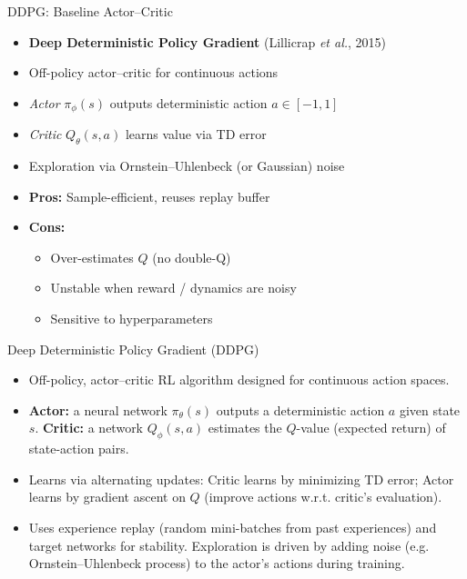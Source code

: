 \documentclass[11pt,aspectratio=169]{beamer}   %
\begin{document}
\begin{frame}{DDPG: Baseline Actor–Critic}
	\begin{itemize}
		\item \textbf{Deep Deterministic Policy Gradient} (Lillicrap \emph{et al.}, 2015)
		\item Off-policy actor–critic for continuous actions
		\item \emph{Actor} $\pi_\phi(s)$ outputs deterministic action $a\in[-1,1]$
		\item \emph{Critic} $Q_\theta(s,a)$ learns value via TD error
		\item Exploration via Ornstein–Uhlenbeck (or Gaussian) noise
		\item \textbf{Pros:} Sample-efficient, reuses replay buffer  
		\item \textbf{Cons:}  
		\begin{itemize}
			\item Over-estimates $Q$ (no double-Q)  
			\item Unstable when reward / dynamics are noisy  
			\item Sensitive to hyperparameters
		\end{itemize}
	\end{itemize}
\end{frame}

\begin{frame}{Deep Deterministic Policy Gradient (DDPG)}
	\begin{itemize}
		\item Off-policy, actor–critic RL algorithm designed for continuous action spaces.
		\item \textbf{Actor:} a neural network $\pi_\theta(s)$ outputs a deterministic action $a$ given state $s$. \textbf{Critic:} a network $Q_\phi(s,a)$ estimates the $Q$-value (expected return) of state-action pairs.
		\item Learns via alternating updates: Critic learns by minimizing TD error; Actor learns by gradient ascent on $Q$ (improve actions w.r.t. critic’s evaluation).
		\item Uses experience replay (random mini-batches from past experiences) and target networks for stability. Exploration is driven by adding noise (e.g. Ornstein–Uhlenbeck process) to the actor’s actions during training.
	\end{itemize}
\end{frame}
\end{document}
